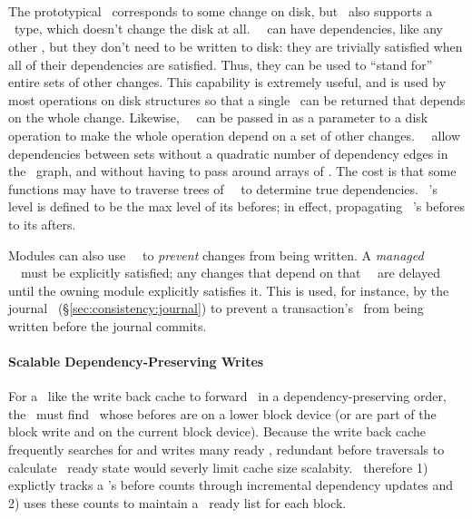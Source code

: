 \paragraph{\Noop\ \ChDescs}
\label{sec:design:chdescs:noop}
The prototypical \chdesc\ corresponds to some change on disk, but \Kudos\
 also supports a \emph{\noop} \chdesc\ type, which doesn't change the disk
 at all.
%
%
\Noop\ \chdescs\ can have dependencies, like any other
\chdesc, but they don't need to be written to disk:  they are trivially satisfied when all of their dependencies are
satisfied.
%
Thus, they can be used to ``stand for'' entire sets of other changes.
%
This capability is extremely useful, and is used by most operations on disk
structures so that a single \chdesc\ can be returned that depends on the whole
change. Likewise, \anoop\ \chdesc\ can be passed in as a parameter to a disk
operation to make the whole operation depend on a set of other changes. \Noop\
\chdescs\ allow dependencies between sets without a quadratic number
of dependency edges in the \chdesc\ graph, and without having to pass around
arrays of \chdescs.
%
The cost is that some functions may have to traverse trees of \noop\ \chdescs\
to determine true dependencies.
%
\Anoop\ \chdesc's level is defined to be the max level of its befores;
in effect, propagating \anoop\ \chdesc's befores to its afters.

Modules can also use \noop\ \chdescs\ to \emph{prevent} changes from being
 written.
%
A \emph{managed} \noop\ \chdesc\ must be explicitly satisfied; any changes that
 depend on that \noop\ \chdesc\ are delayed until the owning module explicitly
 satisfies it.
%
This is used, for instance, by the journal \module\
 (\S\ref{sec:consistency:journal}) to prevent a transaction's \chdescs\
 from being written before the journal commits.

\paragraph{Scalable Dependency-Preserving Writes}
For a \module\ like the write back cache to forward \chdescs\ in a
dependency-preserving order, the \module\ must find \chdescs\ whose
befores are on a lower block device (or are part of the block write
and on the current block device). Because the write back cache
frequently searches for and writes many ready \chdescs{}, redundant
before traversals to calculate \chdesc\ ready state would severly
limit cache size scalabity.
%
\Kudos\ therefore
%
1) explictly tracks a \chdesc{}'s before counts through incremental
dependency updates
%
and 2) uses these counts to maintain a \chdesc\ ready list for each
block.

